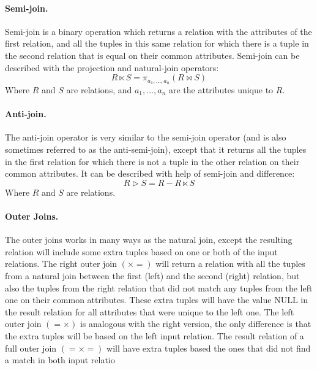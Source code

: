 \paragraph{Semi-join.}
Semi-join is a binary operation which returns a relation with the attributes of the first relation, and all the tuples in this same relation for which there is a tuple in the second relation that is equal on their common attributes. Semi-join can be described with the projection and natural-join operators:
\begin{equation*}
R \ltimes S = \pi _{a_{1},...,a_{n}}(R \bowtie S)
\end{equation*}
Where $R$ and $S$ are relations, and $a_{1},...,a_{n}$ are the attributes unique to $R$.
\paragraph{Anti-join.}
The anti-join operator is very similar to the semi-join operator (and is also sometimes referred to as the anti-semi-join), except that it returns all the tuples in the first relation for which there is not a tuple in the other relation on their common attributes. It can be described with help of semi-join and difference:
\begin{equation*}
R \rhd S = R - R \ltimes S
\end{equation*}
Where $R$ and $S$ are relations.
\paragraph{Outer Joins.}
The outer joins works in many ways as the natural join, except the resulting relation will include some extra tuples based on one or both of the input relations. The right outer join $( \times =)$ will return a relation with all the tuples from a natural join between the first (left) and the second (right) relation, but also the tuples from the right relation that did not match any tuples from the left one on their common attributes. These extra tuples will have the value NULL in the result relation for all attributes that were unique to the left one. The left outer join $(= \times)$ is analogous with the right version, the only difference is that the extra tuples will be based on the left input relation. The result relation of a full outer join $(= \times =)$ will have extra tuples based the ones that did not find a match in both input relatio